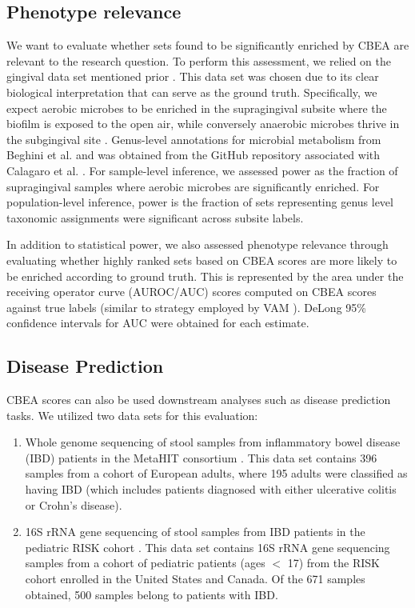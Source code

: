 \documentclass[10pt,letterpaper]{article}
\begin{document}
\subsection*{Phenotype relevance}
We want to evaluate whether sets found to be significantly enriched by CBEA are relevant to the research question. To perform this assessment, we relied on the gingival data set mentioned prior \cite{consortium2012, proctor2019}. This data set was chosen due to its clear biological interpretation that can serve as the ground truth. Specifically, we expect aerobic microbes to be enriched in the supragingival subsite where the biofilm is exposed to the open air, while conversely anaerobic microbes thrive in the subgingival site \cite{thurnheer2016}. Genus-level annotations for microbial metabolism from Beghini et al. \cite{beghini2019} and was obtained from the GitHub repository associated with Calagaro et al. \cite{matteocalgaro2020}. For sample-level inference, we assessed power as the fraction of supragingival samples where aerobic microbes are significantly enriched. For population-level inference, power is the fraction of sets representing genus level taxonomic assignments were significant across subsite labels.  

In addition to statistical power, we also assessed phenotype relevance through evaluating whether highly ranked sets based on CBEA scores are more likely to be enriched according to ground truth. This is represented by the area under the receiving operator curve (AUROC/AUC) scores computed on CBEA scores against true labels (similar to strategy employed by VAM \cite{frost2020}). DeLong 95\% confidence intervals for AUC \cite{delong1988} were obtained for each estimate. 

\subsection*{Disease Prediction}
CBEA scores can also be used downstream analyses such as disease prediction tasks. We utilized two data sets for this evaluation: 

\begin{enumerate}
\item Whole genome sequencing of stool samples from inflammatory bowel disease (IBD) patients in the MetaHIT consortium \cite{nielsen2014}. This data set contains 396 samples from a cohort of European adults, where 195 adults were classified as having IBD (which includes patients diagnosed with either ulcerative colitis or Crohn's disease).

\item 16S rRNA gene sequencing of stool samples from IBD patients in the pediatric RISK cohort \cite{gevers2014}. This data set contains 16S rRNA gene sequencing samples from a cohort of pediatric patients (ages $<$ 17) from the RISK cohort enrolled in the United States and Canada. Of the 671 samples obtained, 500 samples belong to patients with IBD.   
\end{enumerate}
\end{document}
